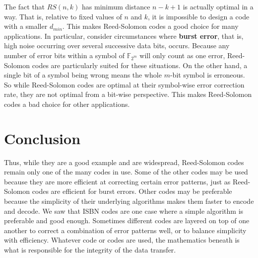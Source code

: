 \documentclass[11pt]{article}
\newcommand{\F}{\mathbb{F}}
\begin{document}
The fact that $RS(n,k)$ has minimum distance $n-k+1$ is actually optimal in a way. \cite[261]{ascodingtheory} 
That is, relative to fixed values of $n$ and $k$, it is impossible to design a code with a smaller $d_{min}$. This makes Reed-Solomon codes a good choice for many applications. In particular, consider circumstances where \textbf{burst error}, that is, high noise occurring over several successive data bits, occurs. Because any number of error bits within a symbol of $\F_{2^{m}}$ will only count as one error, Reed-Solomon codes are particularly suited for these situations. On the other hand, a single bit of a symbol being wrong means the whole $m$-bit symbol is erroneous. So while Reed-Solomon codes are optimal at their symbol-wise error correction rate, they are not optimal from a bit-wise perspective.  This makes Reed-Solomon codes a bad choice for other applications.

\section{Conclusion} 

Thus, while they are a good example and are widespread, Reed-Solomon codes remain only one of the many codes in use. Some of the other codes may be used because they are more efficient at correcting certain error patterns, just as Reed-Solomon codes are efficient for burst errors. Other codes may be preferable because the simplicity of their underlying algorithms makes them faster to encode and decode. We saw that ISBN codes are one case where a simple algorithm is preferable and good enough. Sometimes different codes are layered on top of one another to correct a combination of error patterns well, or to balance simplicity with efficiency. Whatever code or codes are used, the mathematics beneath is what is responsible for the integrity of the data transfer.
\end{document}
